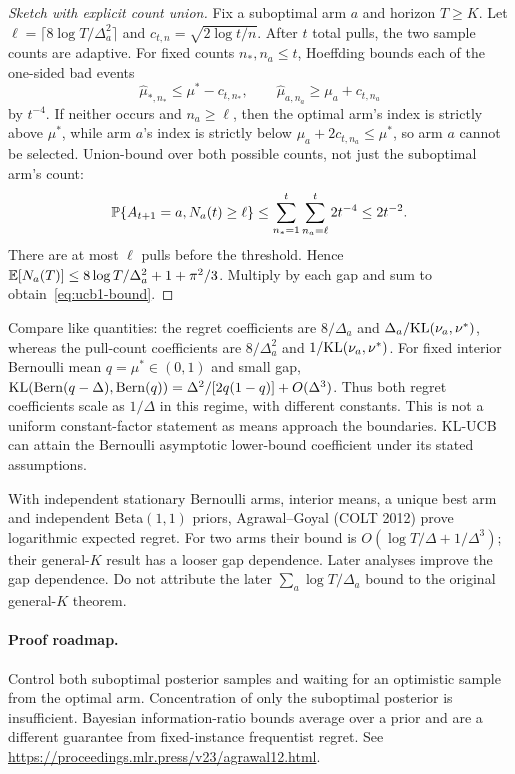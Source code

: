 \documentclass[11pt,oneside]{scrbook}
\begin{document}
\begin{proof}[Sketch with explicit count union]
Fix a suboptimal arm $a$ and horizon $T\ge K$. Let
$\ell=\lceil8\log T/\Delta_a^2\rceil$ and $c_{t,n}=\sqrt{2\log t/n}$.
After $t$ total pulls, the two sample counts are adaptive. For fixed counts
$n_*,n_a\le t$, Hoeffding bounds each of the one-sided bad events
\[
\hat\mu_{*,n_*}\le\mu^*-c_{t,n_*},\qquad
\hat\mu_{a,n_a}\ge\mu_a+c_{t,n_a}
\]
by $t^{-4}$. If neither occurs and $n_a\ge\ell$, then the optimal arm's
index is strictly above $\mu^*$, while arm $a$'s index is strictly below
$\mu_a+2c_{t,n_a}\le\mu^*$, so arm $a$ cannot be selected.
Union-bound over both possible counts, not just the suboptimal arm's count:
\[
\mathbb{P}\{A_{t+1}=a,N_a(t)\ge\ell\}
\le \sum_{n_*=1}^{t}\sum_{n_a=\ell}^{t}2t^{-4}
\le2t^{-2}.
\]
There are at most $\ell$ pulls before the threshold. Hence
$\mathbb{E}[N_a(T)]\le8\log T/\Delta_a^2+1+\pi^2/3$.
Multiply by each gap and sum to obtain~\eqref{eq:ucb1-bound}.
\end{proof}

\begin{remark}
Compare like quantities: the regret coefficients are $8/\Delta_a$ and
$\Delta_a/\mathrm{KL}(\nu_a,\nu^*)$, whereas the pull-count coefficients are
$8/\Delta_a^2$ and $1/\mathrm{KL}(\nu_a,\nu^*)$.
For fixed interior Bernoulli mean $q=\mu^*\in(0,1)$ and small gap,
$\mathrm{KL}(\mathrm{Bern}(q-\Delta),\mathrm{Bern}(q))
=\Delta^2/[2q(1-q)]+O(\Delta^3)$.
Thus both regret coefficients scale as $1/\Delta$ in this regime, with
different constants. This is not a uniform constant-factor statement as
means approach the boundaries. KL-UCB can attain the Bernoulli asymptotic
lower-bound coefficient under its stated assumptions.
\end{remark}

\begin{theorem}
With independent stationary Bernoulli arms, interior means, a unique best arm
and independent Beta$(1,1)$ priors, Agrawal--Goyal (COLT 2012) prove logarithmic
expected regret. For two arms their bound is
$O(\log T/\Delta+1/\Delta^3)$; their general-$K$ result has a looser gap dependence.
Later analyses improve the gap dependence. Do not attribute the later
$\sum_a\log T/\Delta_a$ bound to the original general-$K$ theorem.
\end{theorem}
\paragraph{Proof roadmap.} Control both suboptimal posterior samples and
waiting for an optimistic sample from the optimal arm. Concentration of
only the suboptimal posterior is insufficient. Bayesian information-ratio
bounds average over a prior and are a different guarantee from fixed-instance
frequentist regret. See \url{https://proceedings.mlr.press/v23/agrawal12.html}.
\end{document}
